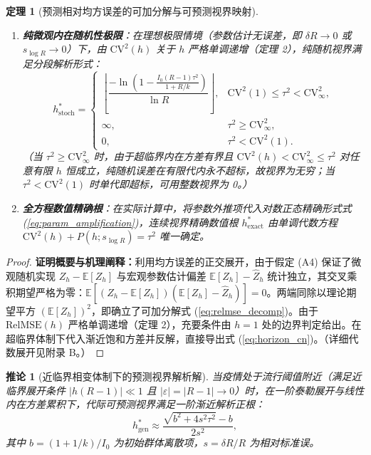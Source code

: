 \documentclass[11pt,a4paper]{article}
\theoremstyle{plain}
\newtheorem{theorem}{定理}
\newtheorem{corollary}{推论}
\theoremstyle{definition}
\begin{document}
\begin{theorem}[预测相对均方误差的可加分解与可预测视界映射]
\begin{enumerate}
\begin{equation}
h^*_{\text{周}} \approx \frac{\mu_g}{7} \cdot \frac{\sqrt{\tau^2 - \frac{1 + R/k}{I_0(R - 1)}}}{s_{\log R}}, \qquad s_{\log R} = \text{SE}(\log \hat{R}) \approx \frac{\delta R}{R}.
\label{eq:horizon_cn}
\end{equation}
\item \textbf{纯微观内在随机性极限}：在理想极限情境（参数估计无误差，即 $\delta R \to 0$ 或 $s_{\log R} \to 0$）下，由 $\text{CV}^2(h)$ 关于 $h$ 严格单调递增（定理 2），纯随机视界满足分段解析形式：
\begin{equation}
h^*_{\text{stoch}} = \begin{cases}
\left\lfloor \dfrac{-\ln\left(1 - \frac{I_0(R - 1)\tau^2}{1 + R/k}\right)}{\ln R} \right\rfloor, & \text{CV}^2(1) \le \tau^2 < \text{CV}^2_\infty, \\[10pt]
\infty, & \tau^2 \ge \text{CV}^2_\infty, \\[6pt]
0, & \tau^2 < \text{CV}^2(1).
\end{cases}
\label{eq:h_stoch_bound}
\end{equation}
（当 $\tau^2 \ge \text{CV}^2_\infty$ 时，由于超临界内在方差有界且 $\text{CV}^2(h) < \text{CV}^2_\infty \le \tau^2$ 对任意有限 $h$ 恒成立，纯随机误差在有限代内永不超标，故视界为无穷；当 $\tau^2 < \text{CV}^2(1)$ 时单代即超标，可用整数视界为 0。）
\item \textbf{全方程数值精确根}：在实际计算中，将参数外推项代入对数正态精确形式式 (\ref{eq:param_amplification})，连续视界精确数值根 $h^*_{\text{exact}}$ 由单调代数方程 $\text{CV}^2(h) + P(h; s_{\log R}) = \tau^2$ 唯一确定。
\end{enumerate}
\end{theorem}

\begin{proof}
\textbf{证明概要与机理阐释：}利用均方误差的正交展开，由于假定 (A4) 保证了微观随机实现 $Z_h - \mathbb{E}[Z_h]$ 与宏观参数估计偏差 $\mathbb{E}[Z_h] - \hat{Z}_h$ 统计独立，其交叉乘积期望严格为零：$\mathbb{E}[(Z_h - \mathbb{E}[Z_h])(\mathbb{E}[Z_h] - \hat{Z}_h)] = 0$。两端同除以理论期望平方 $(\mathbb{E}[Z_h])^2$，即确立了可加分解式 (\ref{eq:relmse_decomp})。由于 $\text{RelMSE}(h)$ 严格单调递增（定理 2），充要条件由 $h=1$ 处的边界判定给出。在超临界体制下代入渐近饱和方差并反解，直接导出式 (\ref{eq:horizon_cn})。（详细代数展开见附录 B。）
\end{proof}

\begin{corollary}[近临界相变体制下的预测视界解析解]\label{cor:near_crit_horizon}
当疫情处于流行阈值附近（满足近临界展开条件 $|h(R - 1)| \ll 1$ 且 $|\varepsilon| = |R - 1| \to 0$）时，在一阶泰勒展开与线性内在方差累积下，代际可预测视界满足一阶渐近解析正根：
\begin{equation}
h^*_{\text{gen}} \approx \frac{\sqrt{b^2 + 4 s^2 \tau^2} - b}{2 s^2},
\label{eq:crit_horizon}
\end{equation}
其中 $b = (1+1/k)/I_0$ 为初始群体离散项，$s = \delta R / R$ 为相对标准误。
\end{corollary}
\end{document}

